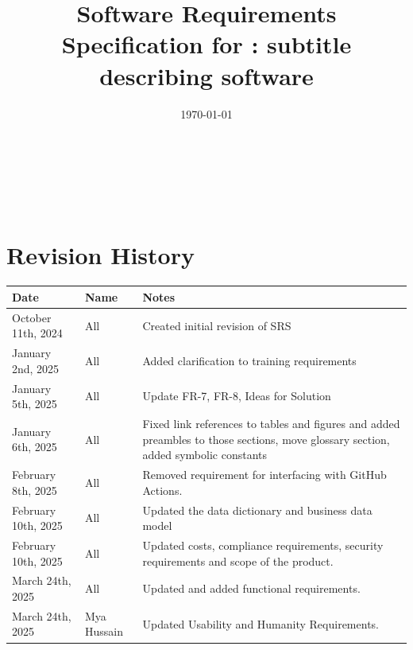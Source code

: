 \documentclass[12pt]{article}
\begin{document}

\title{Software Requirements Specification for \progname: subtitle
describing software}
\author{\authname}
\date{\today}

\maketitle
\thispagestyle{empty}

~\newpage

\tableofcontents

~\newpage

\section*{Revision History}

\begin{tabularx}{\textwidth}{p{3.7cm}p{1.8cm}X}
  \toprule {\textbf{Date}} & {\textbf{Name}} & {\textbf{Notes}}\\
  \midrule
  October 11th, 2024 & All & Created initial revision of SRS\\
  January 2nd, 2025 & All & Added clarification to training requirements\\
  January 5th, 2025 & All & Update FR-7, FR-8, Ideas for Solution \\
  January 6th, 2025 & All & Fixed link references to tables and
  figures and added preambles to those sections, move glossary
  section, added symbolic constants\\
  February 8th, 2025 & All & Removed requirement for interfacing with
  GitHub Actions.\\
  February 10th, 2025 & All & Updated the data dictionary and
  business data model \\
  February 10th, 2025 & All & Updated costs, compliance requirements,
  security requirements and scope of the product. \\
  March 24th, 2025 & All & Updated and added functional requirements. \\
  March 24th, 2025 & Mya Hussain & Updated Usability and Humanity Requirements. \\
  \bottomrule 
\end{tabularx}

~\\

~\newpage
\end{document}
